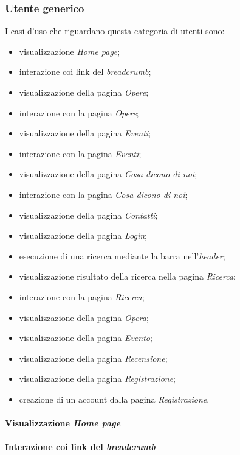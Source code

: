 \subsubsection{Utente generico}
\label{analisi-casi-uso-attori-principali-utente-generico}
I casi d'uso che riguardano questa categoria di utenti sono:
\begin{itemize}
	\item visualizzazione \textit{Home page};
	\item interazione coi link del \textit{breadcrumb};
	\item visualizzazione della pagina \textit{Opere};
	\item interazione con la pagina \textit{Opere};
	\item visualizzazione della pagina \textit{Eventi};
	\item interazione con la pagina \textit{Eventi};
	\item visualizzazione della pagina \textit{Cosa dicono di noi};
	\item interazione con la pagina \textit{Cosa dicono di noi};
	\item visualizzazione della pagina \textit{Contatti};
	\item visualizzazione della pagina \textit{Login};
	\item esecuzione di una ricerca mediante la barra nell'\textit{header};
	\item visualizzazione risultato della ricerca nella pagina \textit{Ricerca};
	\item interazione con la pagina \textit{Ricerca};
	\item visualizzazione della pagina \textit{Opera};
	\item visualizzazione della pagina \textit{Evento};
	\item visualizzazione della pagina \textit{Recensione};
	\item visualizzazione della pagina \textit{Registrazione};
	\item creazione di un account dalla pagina \textit{Registrazione}.
\end{itemize}

\paragraph{Visualizzazione \textit{Home page}}
\label{analisi-casi-uso-attori-principali-utente-generico-1}

\paragraph{Interazione coi link del \textit{breadcrumb}}
\label{analisi-casi-uso-attori-principali-utente-generico-2}

